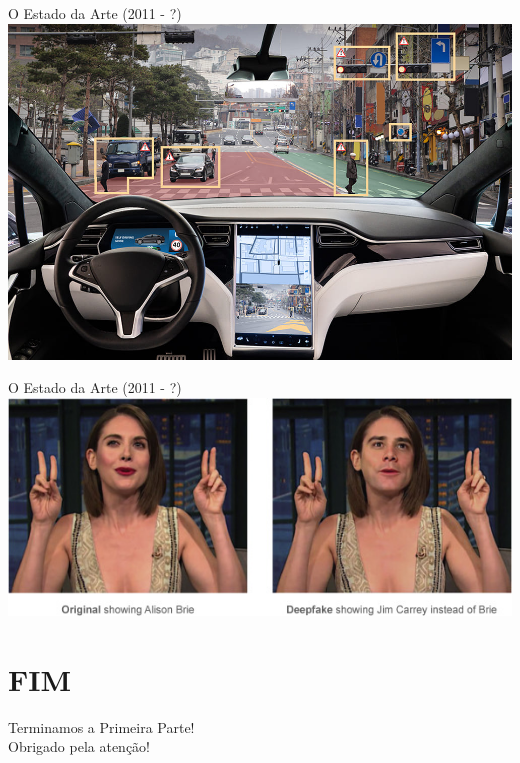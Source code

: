 \documentclass{libs/ufc_format}
\begin{document}
\begin{frame}{O Estado da Arte (2011 - ?)}
    \centering
    \includegraphics[width=\textwidth]{figuras/tesla}
\end{frame}

\begin{frame}{O Estado da Arte (2011 - ?)}
    \centering
    \includegraphics[width=\textwidth]{figuras/deepfake}
\end{frame}

\section{FIM}

\begin{frame}{}
    \centering
    \Large
    Terminamos a Primeira Parte!\\
    Obrigado pela atenção!
\end{frame}

\end{document}
